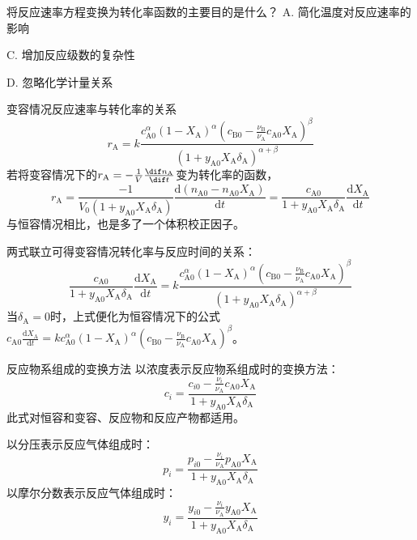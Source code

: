\begin{frame}[t]
    \frametitle{}
    \begin{question}
        将反应速率方程变换为转化率函数的主要目的是什么？
        \tcblower
        A. 简化温度对反应速率的影响


        C. 增加反应级数的复杂性

        D. 忽略化学计量关系
    \end{question}
\end{frame}


\begin{frame}{变容情况反应速率与转化率的关系}
    \[
        r_\mathrm{A}=k\frac{c_\mathrm{A0}^\alpha(1-X_\mathrm{A})^\alpha (c_\mathrm{B0}-\frac{\nu_\mathrm{B}}{\nu_\mathrm{A}}c_\mathrm{A0}X_\mathrm{A})^\beta}{(1+y_\mathrm{A0}X_\mathrm{A}\delta_\mathrm{A})^{\alpha+\beta}}
    \]
    若将变容情况下的$r_\mathrm{A} = -\frac{1}{V}\frac{\dif n_\mathrm{A}}{\dif t}$变为转化率的函数，
    \[
        r_\mathrm{A} = \frac{-1}{V_0(1+y_\mathrm{A0}X_\mathrm{A}\delta_\mathrm{A})}\frac{\mathrm{d}(n_\mathrm{A0}-n_\mathrm{A0}X_\mathrm{A})}{\mathrm{d}t}=\frac{c_\mathrm{A0}}{1+y_\mathrm{A0}X_\mathrm{A}\delta_\mathrm{A}}\frac{\mathrm{d}X_\mathrm{A}}{\mathrm{d}t}
    \]
    与恒容情况相比，也是多了一个体积校正因子。

    两式联立可得变容情况转化率与反应时间的关系：
    \[
        \frac{c_\mathrm{A0}}{1+y_\mathrm{A0}X_\mathrm{A}\delta_\mathrm{A}}\frac{\mathrm{d}X_\mathrm{A}}{\mathrm{d}t} = k\frac{c_\mathrm{A0}^\alpha(1-X_\mathrm{A})^\alpha (c_\mathrm{B0}-\frac{\nu_\mathrm{B}}{\nu_\mathrm{A}}c_\mathrm{A0}X_\mathrm{A})^\beta}{(1+y_\mathrm{A0}X_\mathrm{A}\delta_\mathrm{A})^{\alpha+\beta}}
    \]
    当$\delta_\mathrm{A}=0$时，上式便化为恒容情况下的公式$c_\mathrm{A0}\frac{\mathrm{d}X_\mathrm{A}}{\mathrm{d}t}=kc_\mathrm{A0}^\alpha(1-X_\mathrm{A})^\alpha (c_\mathrm{B0}-\frac{\nu_\mathrm{B}}{\nu_\mathrm{A}}c_\mathrm{A0}X_\mathrm{A})^\beta$。
\end{frame}


\begin{frame}{反应物系组成的变换方法}
    以浓度表示反应物系组成时的变换方法：
    \[
        c_i=\frac{c_{i0}-\frac{\nu_i}{\nu_\mathrm{A}}c_\mathrm{A0}X_\mathrm{A}}{1+y_\mathrm{A0}X_\mathrm{A}\delta_\mathrm{A}}
    \]
    此式对恒容和变容、反应物和反应产物都适用。

    以分压表示反应气体组成时：
    \[
        p_i=\frac{p_{i0}-\frac{\nu_i}{\nu_\mathrm{A}}p_\mathrm{A0}X_\mathrm{A}}{1+y_\mathrm{A0}X_\mathrm{A}\delta_\mathrm{A}}
    \]
    以摩尔分数表示反应气体组成时：
    \[
        y_i=\frac{y_{i0}-\frac{\nu_i}{\nu_\mathrm{A}}y_\mathrm{A0}X_\mathrm{A}}{1+y_\mathrm{A0}X_\mathrm{A}\delta_\mathrm{A}}
    \]
\end{frame}


